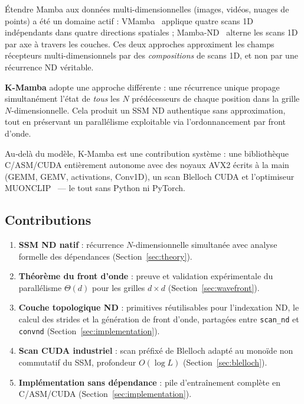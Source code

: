 \documentclass[10pt,onecolumn]{article}
\begin{document}
Étendre Mamba aux données multi-dimensionnelles (images, vidéos, nuages de points)
a été un domaine actif :
VMamba~\cite{vmamba} applique quatre scans 1D indépendants dans quatre directions spatiales ;
Mamba-ND~\cite{mamband} alterne les scans 1D par axe à travers les couches.
Ces deux approches approximent les champs récepteurs multi-dimensionnels par des
\emph{compositions} de scans 1D, et non par une récurrence ND véritable.

\textbf{K-Mamba} adopte une approche différente : une récurrence unique propage
simultanément l'état de \emph{tous} les $N$ prédécesseurs de chaque position
dans la grille $N$-dimensionnelle.
Cela produit un SSM ND authentique sans approximation, tout en préservant un
parallélisme exploitable via l'ordonnancement par front d'onde.

Au‑delà du modèle, K-Mamba est une contribution système :
une bibliothèque C/ASM/CUDA entièrement autonome avec des noyaux AVX2 écrits à la main
(GEMM, GEMV, activations, Conv1D), un scan Blelloch CUDA et l'optimiseur MUONCLIP~\cite{muon2025}
— le tout sans Python ni PyTorch.

\subsection*{Contributions}

\begin{enumerate}
  \item \textbf{SSM ND natif} : récurrence $N$-dimensionnelle simultanée
        avec analyse formelle des dépendances (Section~\ref{sec:theory}).
  \item \textbf{Théorème du front d'onde} : preuve et validation expérimentale
        du parallélisme $\Theta(d)$ pour les grilles $d \times d$ (Section~\ref{sec:wavefront}).
  \item \textbf{Couche topologique ND} : primitives réutilisables pour l'indexation ND,
        le calcul des strides et la génération de front d'onde, partagées entre
        \texttt{scan\_nd} et \texttt{convnd} (Section~\ref{sec:implementation}).
  \item \textbf{Scan CUDA industriel} : scan préfixé de Blelloch adapté
        au monoïde non commutatif du SSM, profondeur $O(\log L)$
        (Section~\ref{sec:blelloch}).
  \item \textbf{Implémentation sans dépendance} : pile d'entraînement complète
        en C/ASM/CUDA (Section~\ref{sec:implementation}).
\end{enumerate}
\end{document}
